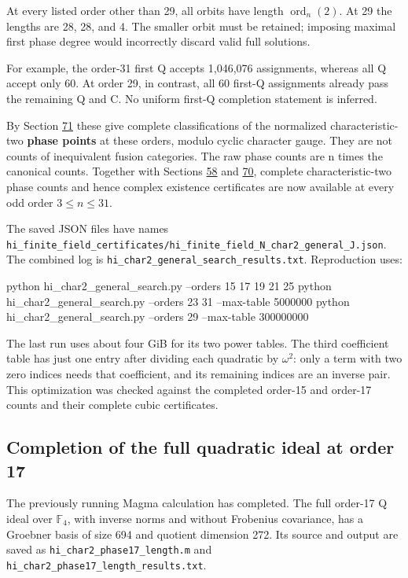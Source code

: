 \documentclass[11pt,reqno]{amsart}
\theoremstyle{plain}
\begin{document}
At every listed order other than 29, all orbits have length
\(\operatorname{ord}_n(2)\). At 29 the lengths are 28, 28,
and 4. The smaller orbit must be retained; imposing maximal first
phase degree would incorrectly discard valid full solutions.

For example, the order-31 first Q accepts 1,046,076 assignments,
whereas all Q accept only 60. At order 29, in contrast, all 60
first-Q assignments already pass the remaining Q and C. No uniform
first-Q completion statement is inferred.

By Section \hyperref[sec:71]{71} these give complete classifications of the normalized
characteristic-two \textbf{phase points} at these orders, modulo cyclic
character gauge. They are not counts of inequivalent fusion categories.
The raw phase counts are n times the canonical counts. Together
with Sections \hyperref[sec:58]{58} and \hyperref[sec:70]{70}, complete characteristic-two phase counts
and hence complex existence certificates are now available at every
odd order \(3\le n\le31\).

The saved JSON files have names
\texttt{hi\_\allowbreak finite\_\allowbreak field\_\allowbreak certificates/hi\_\allowbreak finite\_\allowbreak field\_\allowbreak N\_\allowbreak char2\_\allowbreak general\_\allowbreak J.json}.
The combined log is \texttt{hi\_\allowbreak char2\_\allowbreak general\_\allowbreak search\_\allowbreak results.txt}.
Reproduction uses:

\begin{code}
python hi_char2_general_search.py --orders 15 17 19 21 25
python hi_char2_general_search.py --orders 23 31 --max-table 5000000
python hi_char2_general_search.py --orders 29 --max-table 300000000
\end{code}

The last run uses about four GiB for its two power tables. The
third coefficient table has just one entry after dividing each
quadratic by \(\omega^2\): only a term with two zero indices
needs that coefficient, and its remaining indices are an inverse
pair. This optimization was checked against the completed order-15
and order-17 counts and their complete cubic certificates.

\subsection{Completion of the full quadratic ideal at order 17}\label{sec:72.3}

The previously running Magma calculation has completed. The full
order-17 Q ideal over \(\mathbb F_4\), with inverse norms and
without Frobenius covariance, has a Groebner basis of size 694 and
quotient dimension 272. Its source and output are saved as
\texttt{hi\_\allowbreak char2\_\allowbreak phase17\_\allowbreak length.m} and \texttt{hi\_\allowbreak char2\_\allowbreak phase17\_\allowbreak length\_\allowbreak results.txt}.
\end{document}
